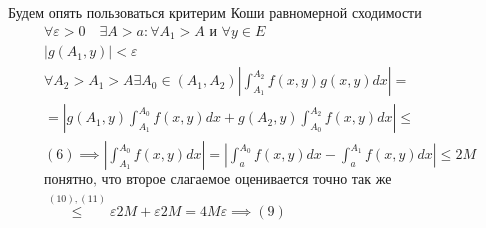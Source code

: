 \documentclass[main]{subfiles}
\begin{document}
     \begin{longProof}
          Будем опять пользоваться критерим Коши равномерной сходимости
          \begin{gather*}
               \forall \varepsilon > 0 \quad \exists A > a : \forall A_1 > A \text{ и } \forall y \in E \\
               |g(A_1,y)| < \varepsilon \tag{10}\\
               \forall A_2 > A_1 > A \exists A_0 \in (A_1,A_2) \left | \int^{A_2}_{A_1} f(x,y)g(x,y)dx \right | = \\
              = \left | g(A_1,y) \int^{A_0}_{A_1} f(x,y)dx + g(A_2,y) \int^{A_2}_{A_0}f(x,y)dx \right | \leq\\
               (6) \implies \left | \int^{A_0}_{A_1}  f(x,y) dx \right | = \left | \int^{A_0}_a f(x,y) dx - \int^{A_1}_a f(x,y)dx \right | \leq 2M \tag{11}\\
               \text{понятно, что второе слагаемое оценивается точно так же} \\
               \stackrel{(10),(11)}{\leq} \varepsilon 2M + \varepsilon 2M = 4 M \varepsilon \implies(9)
          \end{gather*}
     \end{longProof}
\end{document}
